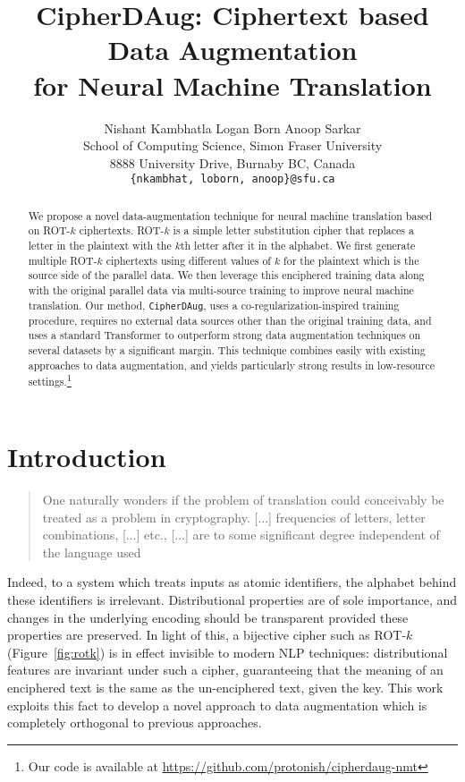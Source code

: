 \documentclass[11pt]{article}
\title{CipherDAug: Ciphertext based Data Augmentation \\for Neural Machine Translation}
\author{Nishant Kambhatla \hspace{1em} Logan Born \hspace{1em} Anoop Sarkar\\
  School of Computing Science, Simon Fraser University \\
  8888 University Drive, Burnaby BC, Canada \\
  \texttt{\{nkambhat, loborn, anoop\}@sfu.ca} \\}
\begin{document}
\maketitle
\begin{abstract}
We propose a novel data-augmentation technique for neural machine translation based on ROT-$k$ ciphertexts. ROT-$k$ is a simple letter substitution cipher that replaces a letter in the plaintext with the $k$th letter after it in the alphabet. We first generate multiple ROT-$k$ ciphertexts using different values of $k$ for the plaintext which is the source side of the parallel data. We then leverage this enciphered training data along with the original parallel data via multi-source training to improve neural machine translation. Our method, \texttt{CipherDAug}, uses a co-regularization-inspired training procedure, requires no external data sources other than the original training data, and uses a standard Transformer to outperform strong data augmentation techniques on several datasets by a significant margin. This technique combines easily with existing approaches to data augmentation, and yields particularly strong results in low-resource settings.\footnote{Our code is available at \url{https://github.com/protonish/cipherdaug-nmt}}
\end{abstract}

\section{Introduction}

\begin{quote}\small
One naturally wonders if the problem of translation could 
conceivably be treated as a problem in cryptography. [...] frequencies of letters, letter combinations, [...] etc., [...] are to some significant degree independent of the language used \cite{weaver-translation}
\end{quote}
Indeed, to a system which treats inputs as atomic identifiers, the alphabet
behind these identifiers is irrelevant. Distributional properties are of sole importance, and changes in the underlying encoding should be transparent provided these properties are preserved. 
In light of this, a bijective cipher such as ROT-$k$ (Figure~\ref{fig:rotk}) is in effect invisible to modern NLP techniques:
distributional features are invariant under such a cipher, guaranteeing 
that the meaning of an enciphered text is the same as the un-enciphered text, given the key.
This work exploits this fact to develop a novel approach to data augmentation which is completely orthogonal to previous approaches.
\end{document}
